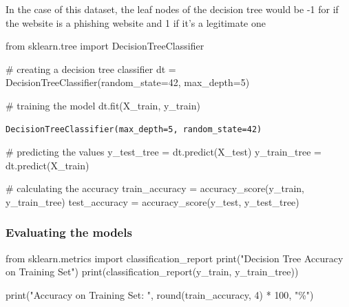 \documentclass[
  letterpaper,
  DIV=11,
  numbers=noendperiod]{scrartcl}
\newenvironment{Shaded}{\begin{snugshade}}{\end{snugshade}}
\newcommand{\BuiltInTok}[1]{\textcolor[rgb]{0.00,0.23,0.31}{#1}}
\newcommand{\CommentTok}[1]{\textcolor[rgb]{0.37,0.37,0.37}{#1}}
\newcommand{\DecValTok}[1]{\textcolor[rgb]{0.68,0.00,0.00}{#1}}
\newcommand{\ImportTok}[1]{\textcolor[rgb]{0.00,0.46,0.62}{#1}}
\newcommand{\NormalTok}[1]{\textcolor[rgb]{0.00,0.23,0.31}{#1}}
\newcommand{\OperatorTok}[1]{\textcolor[rgb]{0.37,0.37,0.37}{#1}}
\newcommand{\StringTok}[1]{\textcolor[rgb]{0.13,0.47,0.30}{#1}}
\begin{document}
In the case of this dataset, the leaf nodes of the decision tree would
be -1 for if the website is a phishing website and 1 if it's a
legitimate one

\begin{Shaded}
\begin{Highlighting}[]
\ImportTok{from}\NormalTok{ sklearn.tree }\ImportTok{import}\NormalTok{ DecisionTreeClassifier}

\CommentTok{\# creating a decision tree classifier}
\NormalTok{dt }\OperatorTok{=}\NormalTok{ DecisionTreeClassifier(random\_state}\OperatorTok{=}\DecValTok{42}\NormalTok{, max\_depth}\OperatorTok{=}\DecValTok{5}\NormalTok{)}

\CommentTok{\# training the model}
\NormalTok{dt.fit(X\_train, y\_train)}
\end{Highlighting}
\end{Shaded}

\begin{verbatim}
DecisionTreeClassifier(max_depth=5, random_state=42)
\end{verbatim}

\begin{Shaded}
\begin{Highlighting}[]
\CommentTok{\# predicting the values}
\NormalTok{y\_test\_tree }\OperatorTok{=}\NormalTok{ dt.predict(X\_test)}
\NormalTok{y\_train\_tree }\OperatorTok{=}\NormalTok{ dt.predict(X\_train)}
\end{Highlighting}
\end{Shaded}

\begin{Shaded}
\begin{Highlighting}[]
\CommentTok{\# calculating the accuracy}
\NormalTok{train\_accuracy }\OperatorTok{=}\NormalTok{ accuracy\_score(y\_train, y\_train\_tree)}
\NormalTok{test\_accuracy }\OperatorTok{=}\NormalTok{ accuracy\_score(y\_test, y\_test\_tree)}
\end{Highlighting}
\end{Shaded}

\hypertarget{evaluating-the-models}{%
\subsubsection{Evaluating the models}\label{evaluating-the-models}}

\begin{Shaded}
\begin{Highlighting}[]
\ImportTok{from}\NormalTok{ sklearn.metrics }\ImportTok{import}\NormalTok{ classification\_report}
\BuiltInTok{print}\NormalTok{(}\StringTok{"Decision Tree Accuracy on Training Set"}\NormalTok{)}
\BuiltInTok{print}\NormalTok{(classification\_report(y\_train, y\_train\_tree))}

\BuiltInTok{print}\NormalTok{(}\StringTok{"Accuracy on Training Set: "}\NormalTok{, }\BuiltInTok{round}\NormalTok{(train\_accuracy, }\DecValTok{4}\NormalTok{) }\OperatorTok{*} \DecValTok{100}\NormalTok{, }\StringTok{"\%"}\NormalTok{)}
\end{Highlighting}
\end{Shaded}
\end{document}

